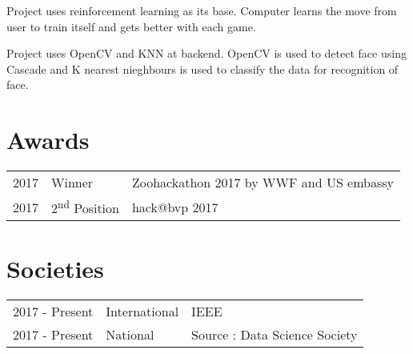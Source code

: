 \documentclass[]{deedy-resume-openfont}
\begin{document}
\begin{minipage}[t]{0.66\textwidth}
Project uses reinforcement learning as its base. Computer learns the move from user to train itself and gets better with each game.
\sectionsep

Project uses OpenCV and KNN at backend. OpenCV is used to detect face using Cascade and K nearest nieghbours is used to classify the data for recognition of face.
\sectionsep


\section{Awards} 
\begin{tabular}{rll}
2017	     & Winner & Zoohackathon 2017 by WWF and US embassy\\
2017	     & 2\textsuperscript{nd} Position & hack@bvp 2017 

\end{tabular}
\sectionsep


\section{Societies} 

\begin{tabular}{rll}
2017 - Present 	&   International & IEEE \\
2017 - Present   & National   & Source : Data Science Society

\end{tabular}
\sectionsep

\end{minipage} 
\end{document}

